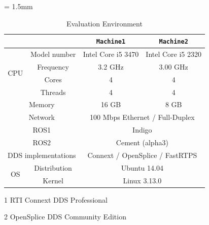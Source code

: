\documentclass{sig-alternate-05-2015}
\begin{document}
\begin{table}[t]
  \caption{Evaluation Environment} 
  \vspace{-3mm}
  \centering
  \begin{threeparttable}
    \renewcommand{\arraystretch}{1.0}
    \label{tb:environment}
    \small
    \tabcolsep = 1.5mm              %
    \begin{tabular}{c|c||c|c}
      \hline
      \multicolumn{2}{c||}{ } & \textbf{\texttt{Machine1}} & \textbf{\texttt{Machine2}} \\ \hline \hline
      \multirow{4}{*}{CPU}   & Model number & Intel Core i5 3470 & Intel Core i5 2320 \\ 
      & Frequency & 3.2 GHz & 3.00 GHz \\ 
      & Cores & 4 & 4 \\ 
      & Threads & 4 & 4 \\ \hline
      \multicolumn{2}{c||}{Memory} & 16 GB & 8 GB \\ \hline 
      \multicolumn{2}{c||}{Network} & \multicolumn{2}{c}{100 Mbps Ethernet / Full-Duplex} \\ \hline
      \multicolumn{2}{c||}{ROS1} & \multicolumn{2}{c}{Indigo} \\ 
      \multicolumn{2}{c||}{ROS2} & \multicolumn{2}{c}{Cement (alpha3)} \\ 
      \multicolumn{2}{c||}{DDS implementations} & \multicolumn{2}{c}{Connext\tnote{1} / OpenSplice\tnote{2} / FastRTPS } \\ \hline 
      \multirow{2}{*}{OS} & Distribution & \multicolumn{2}{c}{Ubuntu 14.04} \\ 
      & Kernel & \multicolumn{2}{c}{Linux 3.13.0} \\ \hline
    \end{tabular}
    \begin{tablenotes}
    \item[1] RTI Connext DDS Professional \cite{rti_connext}
    \item[2] OpenSplice DDS Community Edition \cite{ospl_dds_community}
    \end{tablenotes}
  \end{threeparttable}
  \vspace{-5mm}
\end{table}
\end{document}

